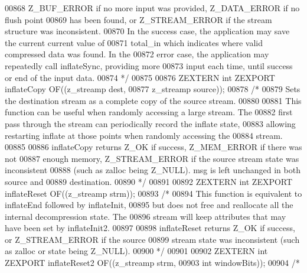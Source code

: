 \begin{DoxyCode}
00868 \textcolor{comment}{   Z\_BUF\_ERROR if no more input was provided, Z\_DATA\_ERROR if no flush point}
00869 \textcolor{comment}{   has been found, or Z\_STREAM\_ERROR if the stream structure was inconsistent.}
00870 \textcolor{comment}{   In the success case, the application may save the current current value of}
00871 \textcolor{comment}{   total\_in which indicates where valid compressed data was found.  In the}
00872 \textcolor{comment}{   error case, the application may repeatedly call inflateSync, providing more}
00873 \textcolor{comment}{   input each time, until success or end of the input data.}
00874 \textcolor{comment}{*/}
00875 
00876 ZEXTERN \textcolor{keywordtype}{int} ZEXPORT inflateCopy OF((z\_streamp dest,
00877                                     z\_streamp source));
00878 \textcolor{comment}{/*}
00879 \textcolor{comment}{     Sets the destination stream as a complete copy of the source stream.}
00880 \textcolor{comment}{}
00881 \textcolor{comment}{     This function can be useful when randomly accessing a large stream.  The}
00882 \textcolor{comment}{   first pass through the stream can periodically record the inflate state,}
00883 \textcolor{comment}{   allowing restarting inflate at those points when randomly accessing the}
00884 \textcolor{comment}{   stream.}
00885 \textcolor{comment}{}
00886 \textcolor{comment}{     inflateCopy returns Z\_OK if success, Z\_MEM\_ERROR if there was not}
00887 \textcolor{comment}{   enough memory, Z\_STREAM\_ERROR if the source stream state was inconsistent}
00888 \textcolor{comment}{   (such as zalloc being Z\_NULL).  msg is left unchanged in both source and}
00889 \textcolor{comment}{   destination.}
00890 \textcolor{comment}{*/}
00891 
00892 ZEXTERN \textcolor{keywordtype}{int} ZEXPORT inflateReset OF((z\_streamp strm));
00893 \textcolor{comment}{/*}
00894 \textcolor{comment}{     This function is equivalent to inflateEnd followed by inflateInit,}
00895 \textcolor{comment}{   but does not free and reallocate all the internal decompression state.  The}
00896 \textcolor{comment}{   stream will keep attributes that may have been set by inflateInit2.}
00897 \textcolor{comment}{}
00898 \textcolor{comment}{     inflateReset returns Z\_OK if success, or Z\_STREAM\_ERROR if the source}
00899 \textcolor{comment}{   stream state was inconsistent (such as zalloc or state being Z\_NULL).}
00900 \textcolor{comment}{*/}
00901 
00902 ZEXTERN \textcolor{keywordtype}{int} ZEXPORT inflateReset2 OF((z\_streamp strm,
00903                                       \textcolor{keywordtype}{int} windowBits));
00904 \textcolor{comment}{/*}

\end{DoxyCode}
